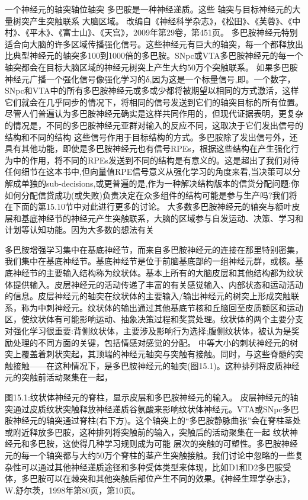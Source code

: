 一个神经元的轴突轴位轴突
多巴胺是一种神经递质。这些
轴突与目标神经元的大量树突产生突触联系
大脑区域。
改编自《神经科学杂志》，《松田》、《芙蓉》、《中村》、《平木》、《富士山》、《天宫》，2009年第29卷，第451页。
多巴胺神经元特别适合向大脑的许多区域传播强化信号。这些神经元有巨大的轴突，每一个都释放出比典型神经元的轴突多100到1000倍的多巴胺。SNpc或VTA多巴胺神经元的每一个轴突都会在目标大脑区域的神经元树突上产生大约50万个突触联系。
如果多巴胺神经元广播一个强化信号像强化学习的δ,因为这是一个标量信号,即。一个数字，SNpc和VTA中的所有多巴胺神经元或多或少都将被期望以相同的方式激活，这样它们就会在几乎同步的情况下，将相同的信号发送到它们的轴突目标的所有位置。尽管人们普遍认为多巴胺神经元确实是这样共同作用的，但现代证据表明，更复杂的情况是，不同的多巴胺神经元亚群对输入的反应不同，这取决于它们发出信号的结构和不同的结构
这些信号作用于目标结构的方式。多巴胺除了发出信号外，还具有其他功能，即使是多巴胺神经元也有信号RPEs，根据这些结构在产生强化行为中的作用，将不同的RPEs发送到不同的结构是有意义的。这是超出了我们对待任何细节在这本书中,但向量值RPE信号意义从强化学习的角度来看,当决策可以分解成单独的sub-decisions,或更普遍的是,作为一种解决结构版本的信贷分配问题:你如何分配信贷成功(或失败)负责决定在众多组件的结构可能是参与生产吗?我们将在下面的第15.10节中对此进行更多的讨论。
大多数多巴胺神经元的轴突与额叶皮层和基底神经节的神经元产生突触联系，大脑的区域参与自发运动、决策、学习和计划等认知功能。因为大多数的想法有关

多巴胺增强学习集中在基底神经节，而来自多巴胺神经元的连接在那里特别密集，我们集中在基底神经节。基底神经节是位于前脑基底部的一组神经元群，或核。基底神经节的主要输入结构称为纹状体。基本上所有的大脑皮层和其他结构都为纹状体提供输入。皮层神经元的活动传递了丰富的有关感觉输入、内部状态和运动活动的信息。皮层神经元的轴突在纹状体的主要输入/输出神经元的树突上形成突触联系，称为中刺神经元。纹状体的输出通过其他基底节核和丘脑回至皮质额区和运动区，使纹状体有可能影响运动、抽象决策过程和奖赏处理。纹状体的两个主要分支对强化学习很重要:背侧纹状体，主要涉及影响行为选择;腹侧纹状体，被认为是奖励处理的不同方面的关键，包括情感对感觉的分配。
中等大小的刺状神经元的树突上覆盖着刺状突起，其顶端的神经元轴突与突触有接触。同时，与这些脊髓的突触接触——在这种情况下，是多巴胺神经元的轴突(图15.1)。这种排列将皮质神经元的突触前活动聚集在一起，
 
 
图15.1:纹状体神经元的脊柱，显示皮层和多巴胺神经元的输入。
皮层神经元的轴突通过皮质纹状突触释放神经递质谷氨酸来影响纹状体神经元。VTA或SNpc多巴胺神经元的轴突通过脊柱(右下方)。这个轴突上的“多巴胺静脉曲张”会在脊柱茎处或附近释放多巴胺，这种排列将突触前的输入，突触后的活动聚集在一起
纹状神经元和多巴胺，这使得几种学习规则成为可能
层次的突触的可塑性。多巴胺神经元的每一个轴突都与大约50万个脊柱的茎产生突触接触。我们讨论中忽略的一些复杂性可以通过其他神经递质途径和多种受体类型来体现，比如D1和D2多巴胺受体，多巴胺可以在棘突和其他突触后部位产生不同的效果。《神经生理学杂志》，W.舒尔茨，1998年第80页，第10页。

